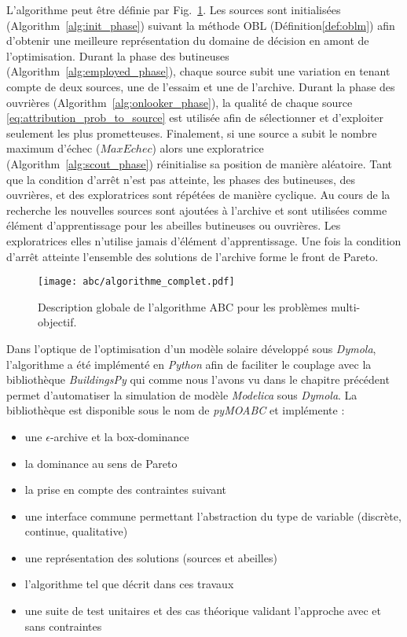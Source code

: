 L’algorithme peut être définie par Fig.~\ref{fig:abc_complet}.
Les sources sont initialisées (Algorithm~\ref{alg:init_phase}) suivant la méthode
OBL (Définition\ref{def:oblm}) afin d’obtenir une meilleure représentation du
domaine de décision en amont de l’optimisation.
Durant la phase des butineuses (Algorithm~\ref{alg:employed_phase}), chaque source
subit une variation en tenant compte de deux sources, une de l’essaim et une de l’archive.
Durant la phase des ouvrières (Algorithm~\ref{alg:onlooker_phase}), la qualité de
chaque source \eqref{eq:attribution_prob_to_source} est utilisée afin de sélectionner
et d’exploiter seulement les plus prometteuses. Finalement, si une source a subit le
nombre maximum d’échec ($MaxEchec$) alors une exploratrice (Algorithm~\ref{alg:scout_phase})
réinitialise sa position de manière aléatoire.
Tant que la condition d’arrêt n’est pas atteinte, les phases des butineuses,
des ouvrières, et des exploratrices sont répétées de manière cyclique. Au cours de
la recherche les nouvelles sources sont ajoutées à l’archive et sont utilisées
comme élément d’apprentissage pour les abeilles butineuses ou ouvrières. Les
exploratrices elles n’utilise jamais d’élément d’apprentissage. Une fois la condition
d’arrêt atteinte l’ensemble des solutions de l’archive forme le front de Pareto.

\begin{figure}
    \begin{center}
        \texttt{[image: abc/algorithme\_complet.pdf]}
    \end{center}
    \caption{Description globale de l’algorithme ABC pour les problèmes multi-objectif.
             \label{fig:abc_complet}}
\end{figure}

Dans l’optique de l’optimisation d’un modèle solaire développé sous \emph{Dymola}, l’algorithme
a été implémenté en \emph{Python} afin de faciliter le couplage avec la bibliothèque
\emph{BuildingsPy} qui comme nous l’avons vu dans le chapitre précédent permet d’automatiser
la simulation de modèle \emph{Modelica} sous \emph{Dymola}. La bibliothèque est
disponible sous le nom de \emph{pyMOABC} et implémente :
\begin{itemize}
  \item une $\epsilon$-archive et la box-dominance
  \item la dominance au sens de Pareto
  \item la prise en compte des contraintes suivant \cite{Woldesenbet20073077}
  \item une interface commune permettant l’abstraction du type de variable (discrète, continue, qualitative)
  \item une représentation des solutions (sources et abeilles)
  \item l’algorithme tel que décrit dans ces travaux
  \item une suite de test unitaires et des cas théorique validant l’approche avec
        et sans contraintes
\end{itemize}

